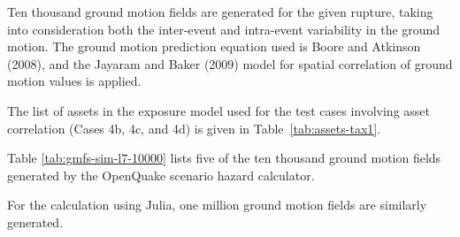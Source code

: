 Ten thousand ground motion fields are generated for the given rupture, taking into consideration both the inter-event and intra-event variability in the ground motion. The ground motion prediction equation used is Boore and Atkinson (2008), and the Jayaram and Baker (2009) model for spatial correlation of ground motion values is applied.



The list of assets in the exposure model used for the test cases involving asset correlation (Cases 4b, 4c, and 4d) is given in Table~\ref{tab:assets-tax1}.



Table \ref{tab:gmfs-sim-l7-10000} lists five of the ten thousand ground motion fields generated by the OpenQuake scenario hazard calculator.

For the calculation using Julia, one million ground motion fields are similarly generated.